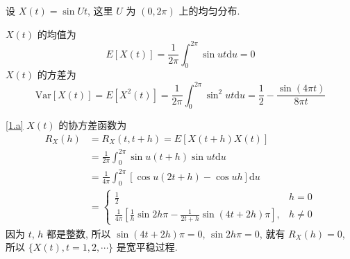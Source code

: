 \documentclass[boxes]{homework}
\begin{document}
\begin{problem}
设 $X(t) = \sin Ut$, 这里 $U$ 为 $(0, 2\pi)$ 上的均匀分布.
\begin{parts}[a]
    \part \label{1.a} 若 $t = 1, 2, \cdots$, 证明 $\{X(t), t = 1, 2, \cdots\}$ 是宽平稳但不是严平稳过程,
    \part \label{1.b} 设 $t\in [0, \infty)$, 证明 $\{X(t), t \geq 0\}$ 既不是宽平稳也不是严平稳过程.
\end{parts}
\end{problem}
\begin{solution}
    $X(t)$ 的均值为
    \begin{equation}
        E[X(t)] = \frac{1}{2\pi}\int_0^{2\pi}\sin ut\mathrm{d}u = 0
    \end{equation}
    $X(t)$ 的方差为
    \begin{equation}
        \mathrm{Var}[X(t)]=E[X^2(t)]=\frac{1}{2\pi}\int_0^{2\pi}\sin^2 ut\mathrm{d}u=\frac{1}{2}-\frac{\sin(4\pi t)}{8\pi t}
    \end{equation}

    \ref{1.a} $X(t)$ 的协方差函数为
    \begin{equation} \label{eq:1.3}
        \begin{aligned}
            R_X(h) & = R_X(t, t+h) = E[X(t+h)X(t)]                                                                                                           \\
                   & = \frac{1}{2\pi}\int_0^{2\pi} \sin u(t + h) \sin ut\mathrm{d} u                                                                         \\
                   & = \frac{1}{4\pi}\int_0^{2\pi} [\cos u(2t+h) - \cos uh]\mathrm{d} u                                                                      \\
                   & = \begin{cases}
                           \displaystyle\frac{1}{2}                                                                         & h = 0   \\
                           \displaystyle\frac{1}{4\pi}\left[\frac{1}{h}\sin 2h\pi - \frac{1}{2t + h}\sin (4t+2h)\pi\right], & h\neq 0
                       \end{cases}
        \end{aligned}
    \end{equation}
    因为 $t$, $h$ 都是整数, 所以 $\sin (4t+2h)\pi = 0$, $\sin 2h\pi = 0$, 就有 $R_X(h) = 0$, 所以
    $\{X(t), t = 1, 2, \cdots\}$ 是宽平稳过程.


\end{solution}
\end{document}
